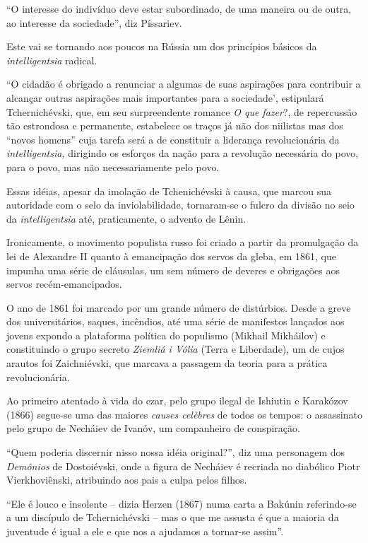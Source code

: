 ``O interesse do indivíduo deve estar subordinado, de uma maneira ou de
outra, ao interesse da sociedade'', diz Píssariev.

Este vai se tornando aos poucos na Rússia um dos princípios básicos da
\emph{intelligentsia} radical.

``O cidadão é obrigado a renunciar a algumas de suas aspirações para
contribuir a alcançar outras aspirações mais importantes para a
sociedade', estipulará Tchernichévski, que, em seu surpreendente romance
\emph{O que fazer}?, de repercussão tão estrondosa e permanente,
estabelece os traços já não dos niilistas mas dos ``novos homens'' cuja
tarefa será a de constituir a liderança revolucionária da
\emph{intelligentsia,} dirigindo os esforços da nação para a revolução
necessária do povo, para o povo, mas não necessariamente pelo povo.

Essas idéias, apesar da imolação de Tchenichévski à causa, que marcou
sua autoridade com o selo da inviolabilidade, tornaram-se o fulcro da
divisão no seio da \emph{intelligentsia} até, praticamente, o advento de
Lênin.

Ironicamente, o movimento populista russo foi criado a partir da
promulgação da lei de Alexandre II quanto à emancipação dos servos da
gleba, em 1861, que impunha uma série de cláusulas, um sem número de
deveres e obrigações aos servos recém-emancipados.

O ano de 1861 foi marcado por um grande número de distúrbios. Desde a
greve dos universitários, saques, incêndios, até uma série de manifestos
lançados aos jovens expondo a plataforma política do populismo (Mikhail
Mikháilov) e constituindo o grupo secreto \emph{Ziemliá i Vólia} (Terra
e Liberdade), um de cujos arautos foi Zaichniévski, que marcava a
passagem da teoria para a prática revolucionária.

Ao primeiro atentado à vida do czar, pelo grupo ilegal de Ishiutin e
Karakózov (1866) segue-se uma das maiores \emph{causes celèbres} de
todos os tempos: o assassinato pelo grupo de Necháiev de Ivanóv, um
companheiro de conspiração.

``Quem poderia discernir nisso nossa idéia original?'', diz uma
personagem dos \emph{Demônios} de Dostoiévski, onde a figura de Necháiev
é recriada no diabólico Piotr Vierkhoviênski, atribuindo aos pais a
culpa pelos filhos.

``Ele é louco e insolente -- dizia Herzen (1867) numa carta a Bakúnin
referindo-se a um discípulo de Tchernichévski -- mas o que me assusta é
que a maioria da juventude é igual a ele e que nos a ajudamos a
tornar-se assim''.

